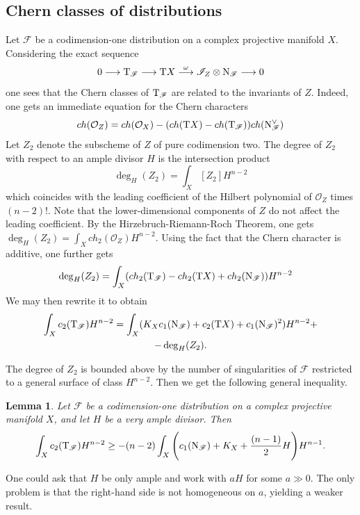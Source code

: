 \documentclass[a4paper, 11pt]{amsart}
\theoremstyle{plain}
\numberwithin{theorem}{section}
\newtheorem{lemma}[theorem]{Lemma}
\theoremstyle{definition}
\newcommand{\OO}{\mathcal{O}}
\newcommand{\OX}{\mathcal{O}_X}
\newcommand{\lra}{\longrightarrow}
\newcommand{\sF}{\mathscr{F}}
\newcommand{\sI}{\mathscr{I}}
\newcommand{\tF}{{\rm T}_\mathscr{F}}
\newcommand{\nF}{{\rm N}_\mathscr{F}}
\newcommand{\tX}{{\rm T}X}
\begin{document}
\subsection{Chern classes of distributions}
Let $\sF$ be a codimension-one distribution on a complex projective manifold $X$. Considering the exact sequence
\[
0 \lra \tF \lra \tX \stackrel{\omega}{\lra} \sI_Z\otimes \nF \lra 0
\]
one sees that the Chern classes of $\tF$ are related to the invariants of $Z$. Indeed, one gets an immediate equation for the Chern characters
\[
ch(\OO_Z) = ch(\OX) - (ch(\tX) -ch(\tF))ch(\nF^\vee)
\]
Let $Z_2$ denote the subscheme of $Z$ of pure codimension two. The degree of $Z_2$ with respect to an ample divisor $H$ is the intersection product
\[
\deg_H(Z_2) = \int_X [Z_2] H^{n-2} 
\]
which coincides with the leading coefficient of the Hilbert polynomial of $\OO_Z$ times $(n-2)!$. Note that the lower-dimensional components of $Z$ do not affect the leading coefficient. By the Hirzebruch-Riemann-Roch Theorem, one gets $\deg_H(Z_2) = \int_Xch_2(\OO_Z)H^{n-2}$. Using the fact that the Chern character is additive, one further gets
\begin{align*}
  \deg_H(Z_2) %
  & = \int_X (ch_2(\tF) - ch_2(\tX) + ch_2(\nF))H^{n-2}
\end{align*}
We may then rewrite it to obtain
\begin{multline}\label{eq:c2tf}
    \int_X c_2(\tF) H^{n-2} =  \int_X (K_X c_1(\nF)+ c_2(\tX) + c_1(\nF)^2 )H^{n-2}+ \\ -  \deg_H(Z_2) .  
\end{multline}

The degree of $Z_2$ is bounded above by the number of singularities of $\sF$ restricted to a general surface of class $H^{n-2}$. Then we get the following general inequality. 

\begin{lemma}\label{lem:lower-bound}
Let $\sF$ be a codimension-one distribution on a complex projective manifold $X$, and let $H$ be a very ample divisor. Then
\begin{equation}\label{eq:bound-C2}
\int_X c_2(\tF)H^{n-2} \geq -(n-2)\int_X \Bigg(  c_1(\nF) +K_X +\frac{(n-1) }{2} H\Bigg)H^{n-1}.    
\end{equation}
\end{lemma}

One could ask that $H$ be only ample and work with $aH$ for some $a \gg 0$. The only problem is that the right-hand side is not homogeneous on $a$, yielding a weaker result.
\end{document}
